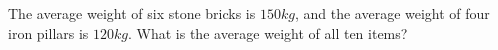 The average weight of six stone bricks is $150kg$, and the average weight of four iron pillars is $120kg$. What is the average weight of all ten items?
